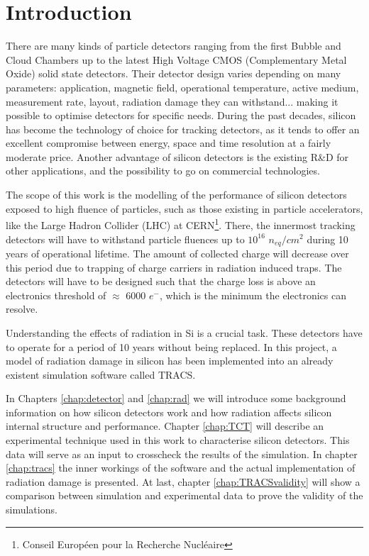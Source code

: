 \clearpage
{}  %
\chapter{Introduction}

There are many kinds of particle detectors ranging from the first Bubble and Cloud Chambers up to the latest High Voltage CMOS (Complementary Metal Oxide) solid state detectors. Their detector design varies depending on many parameters: application, magnetic field, operational temperature, active medium, measurement rate, layout, radiation damage they can withstand... making it possible to optimise detectors for specific needs. During the past decades, silicon has become the technology of choice for tracking detectors, as it tends to offer an excellent compromise between energy, space and time resolution at a fairly moderate price. Another advantage of silicon detectors is the existing R\&D for other applications, and the possibility to go on commercial technologies.

 The scope of this work is the modelling of the performance of silicon detectors exposed to high fluence of particles, such as those existing in particle accelerators, like the Large Hadron Collider (LHC) at CERN\footnote{Conseil Européen pour la Recherche Nucléaire}. There, the innermost tracking detectors will have to withstand particle fluences up to $10^{16}$ $n_{eq}/cm^{2}$  during 10 years of operational lifetime. The amount of collected charge will decrease over this period due to trapping of charge carriers in radiation induced traps. The detectors will have to be designed such that the charge loss is above an electronics threshold of $\approx$ 6000 $e^{-}$, which is the minimum the electronics can resolve. 

 Understanding the effects of radiation in Si is a crucial task. These detectors have to operate for a period of 10 years without being replaced. In this project, a model of radiation damage in silicon has been implemented into an already existent simulation software called TRACS\cite{TRACS}. 
 
In Chapters \ref{chap:detector} and \ref{chap:rad} we will introduce some background information on how silicon detectors work and how radiation affects silicon internal structure and performance. Chapter \ref{chap:TCT} will describe an experimental technique used in this work to characterise silicon detectors. This data will serve as an input to crosscheck the results of the simulation. In chapter \ref{chap:tracs} the inner workings of the software and the actual implementation of radiation damage is presented. At last, chapter \ref{chap:TRACSvalidity} will show a comparison between simulation and experimental data to prove the validity of the simulations. 

